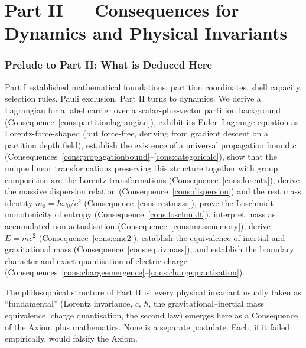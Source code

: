 \documentclass[11pt,twocolumn,a4paper]{article}
\theoremstyle{axiomstyle}
\theoremstyle{conseqstyle}
\theoremstyle{definition}
\theoremstyle{remark}
\begin{document}
\clearpage

\part*{Part II --- Consequences for Dynamics and Physical Invariants}

\section*{Prelude to Part II: What is Deduced Here}

Part I established mathematical foundations: partition coordinates, shell capacity, selection rules, Pauli exclusion. Part II turns to dynamics. We derive a Lagrangian for a label carrier over a scalar-plus-vector partition background (Consequence~\ref{cons:partitionlagrangian}), exhibit its Euler--Lagrange equation as Lorentz-force-shaped (but force-free, deriving from gradient descent on a partition depth field), establish the existence of a universal propagation bound $c$ (Consequences~\ref{cons:propagationbound}--\ref{cons:categoricalc}), show that the unique linear transformations preserving this structure together with group composition are the Lorentz transformations (Consequence~\ref{cons:lorentz}), derive the massive dispersion relation (Consequence~\ref{cons:dispersion}) and the rest mass identity $m_{0}=\hbar\omega_{0}/c^{2}$ (Consequence~\ref{cons:restmass}), prove the Loschmidt monotonicity of entropy (Consequence~\ref{cons:loschmidt}), interpret mass as accumulated non-actualisation (Consequence~\ref{cons:massmemory}), derive $E=mc^{2}$ (Consequence~\ref{cons:emc2}), establish the equivalence of inertial and gravitational mass (Consequence~\ref{cons:equivmass}), and establish the boundary character and exact quantisation of electric charge (Consequences~\ref{cons:chargeemergence}--\ref{cons:chargequantisation}).

The philosophical structure of Part II is: every physical invariant usually taken as ``fundamental'' (Lorentz invariance, $c$, $\hbar$, the gravitational--inertial mass equivalence, charge quantisation, the second law) emerges here as a Consequence of the Axiom plus mathematics. None is a separate postulate. Each, if it failed empirically, would falsify the Axiom.
\end{document}
